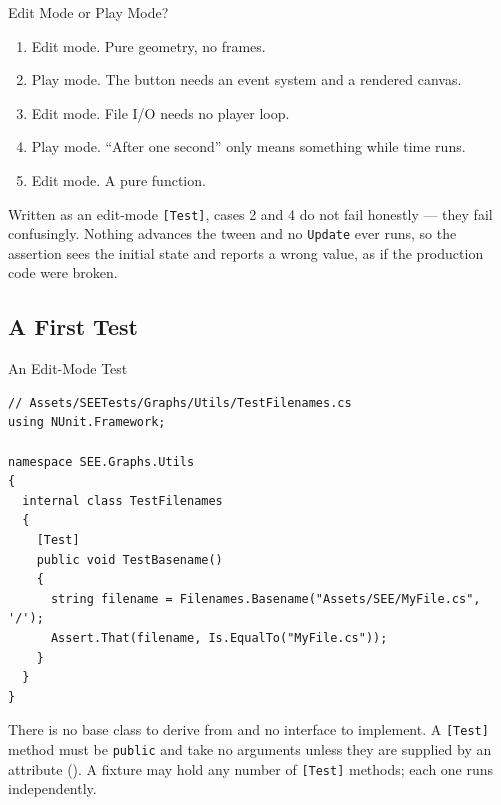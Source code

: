\begin{solutionframe}{Edit Mode or Play Mode?}
  \begin{enumerate}
    \item Edit mode. Pure geometry, no frames.
    \item Play mode. The button needs an event system and a rendered canvas.
    \item Edit mode. File I/O needs no player loop.
    \item Play mode. ``After one second'' only means something while time runs.
    \item Edit mode. A pure function.
  \end{enumerate}
  \vspace{1ex}

  Written as an edit-mode \texttt{[Test]}, cases 2 and 4 do not fail
  honestly --- they fail confusingly. Nothing advances the tween and no
  \texttt{Update} ever runs, so the assertion sees the initial state and reports
  a wrong value, as if the production code were broken.
  \vspace{2ex}

\end{solutionframe}

\subsection{A First Test}

\begin{frame}[fragile]{An Edit-Mode Test}
  \begin{lstlisting}[basicstyle=\scriptsize\ttfamily]
// Assets/SEETests/Graphs/Utils/TestFilenames.cs
using NUnit.Framework;

namespace SEE.Graphs.Utils
{
  internal class TestFilenames
  {
    [Test]
    public void TestBasename()
    {
      string filename = Filenames.Basename("Assets/SEE/MyFile.cs", '/');
      Assert.That(filename, Is.EqualTo("MyFile.cs"));
    }
  }
}
  \end{lstlisting}
  \vspace{1ex}

  There is no base class to derive from and no interface to implement. A
  \texttt{[Test]} method must be \texttt{public} and take no arguments unless
  they are supplied by an attribute (). A fixture
  may hold any number of \texttt{[Test]} methods; each one runs independently.

\end{frame}

